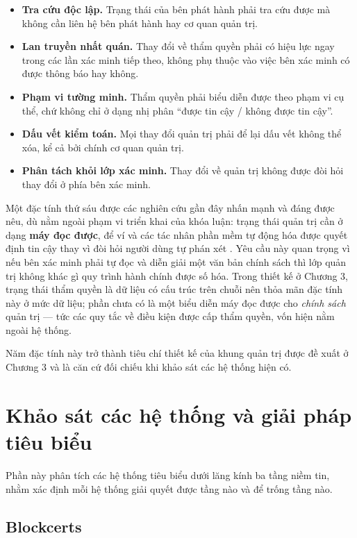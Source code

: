 \begin{itemize}
    \item \textbf{Tra cứu độc lập.} Trạng thái của bên phát hành phải tra cứu được mà không cần liên hệ bên phát hành hay cơ quan quản trị.
    \item \textbf{Lan truyền nhất quán.} Thay đổi về thẩm quyền phải có hiệu lực ngay trong các lần xác minh tiếp theo, không phụ thuộc vào việc bên xác minh có được thông báo hay không.
    \item \textbf{Phạm vi tường minh.} Thẩm quyền phải biểu diễn được theo phạm vi cụ thể, chứ không chỉ ở dạng nhị phân {``}được tin cậy / không được tin cậy{''}.
    \item \textbf{Dấu vết kiểm toán.} Mọi thay đổi quản trị phải để lại dấu vết không thể xóa, kể cả bởi chính cơ quan quản trị.
    \item \textbf{Phân tách khỏi lớp xác minh.} Thay đổi về quản trị không được đòi hỏi thay đổi ở phía bên xác minh.
\end{itemize}

Một đặc tính thứ sáu được các nghiên cứu gần đây nhấn mạnh và đáng được nêu, dù nằm ngoài phạm vi triển khai của khóa luận: trạng thái quản trị cần ở dạng \textbf{máy đọc được}, để ví và các tác nhân phần mềm tự động hóa được quyết định tin cậy thay vì đòi hỏi người dùng tự phán xét \cite{Weigl2025}. Yêu cầu này quan trọng vì nếu bên xác minh phải tự đọc và diễn giải một văn bản chính sách thì lớp quản trị không khác gì quy trình hành chính được số hóa. Trong thiết kế ở Chương 3, trạng thái thẩm quyền là dữ liệu có cấu trúc trên chuỗi nên thỏa mãn đặc tính này ở mức dữ liệu; phần chưa có là một biểu diễn máy đọc được cho \emph{chính sách} quản trị --- tức các quy tắc về điều kiện được cấp thẩm quyền, vốn hiện nằm ngoài hệ thống.

Năm đặc tính này trở thành tiêu chí thiết kế của khung quản trị được đề xuất ở Chương 3 và là căn cứ đối chiếu khi khảo sát các hệ thống hiện có.

\section{Khảo sát các hệ thống và giải pháp tiêu biểu}

Phần này phân tích các hệ thống tiêu biểu dưới lăng kính ba tầng niềm tin, nhằm xác định mỗi hệ thống giải quyết được tầng nào và để trống tầng nào.

\subsection{Blockcerts}

